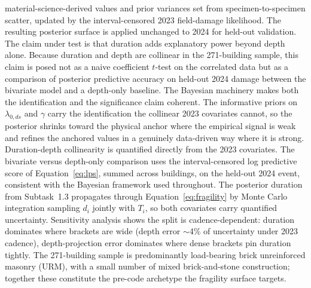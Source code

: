 \documentclass[11pt]{article}
\begin{document}
material-science-derived values and prior variances set from specimen-to-specimen
scatter, updated by the interval-censored 2023 field-damage likelihood. The
resulting posterior surface is applied unchanged to 2024 for held-out validation.
The claim under test is that duration adds explanatory power beyond depth alone.
Because duration and depth are collinear in the 271-building sample, this claim is
posed not as a naive coefficient $t$-test on the correlated data but as a
comparison of posterior predictive accuracy on held-out 2024 damage between the
bivariate model and a depth-only baseline. The Bayesian machinery makes both the
identification and the significance claim coherent. The informative priors on
$\lambda_{0,ds}$ and $\gamma$ carry the identification the collinear 2023
covariates cannot, so the posterior shrinks toward the physical anchor where the
empirical signal is weak and refines the anchored values in a genuinely
data-driven way where it is strong.
Duration-depth collinearity is quantified directly from the 2023 covariates.
The bivariate versus depth-only comparison uses the interval-censored log
predictive score of Equation~\eqref{eq:lps}, summed across buildings, on the
held-out 2024 event, consistent with the Bayesian framework used throughout.
The posterior duration from Subtask~1.3 propagates through
Equation~\eqref{eq:fragility} by Monte Carlo integration sampling $d_i$ jointly
with $T_i$, so both covariates carry quantified uncertainty. Sensitivity analysis
shows the split is cadence-dependent: duration dominates where brackets are wide
(depth error ${\sim}$4\% of uncertainty under 2023 cadence), depth-projection
error dominates where dense brackets pin duration tightly.
The 271-building sample is predominantly load-bearing brick unreinforced masonry
(URM), with a small number of mixed brick-and-stone construction; together these
constitute the pre-code archetype the fragility surface targets.
\end{document}
